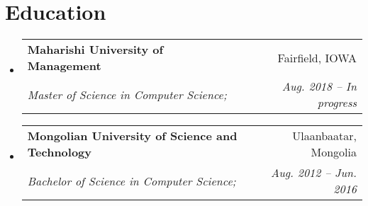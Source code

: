 \documentclass[letterpaper,11pt]{article}
\makeatletter
\newcommand{\resumeSubheading}[4]{
  \vspace{-1pt}\item
    \begin{tabular*}{0.97\textwidth}[t]{l@{\extracolsep{\fill}}r}
      \textbf{#1} & #2 \\
      \textit{\small#3} & \textit{\small #4} \\
    \end{tabular*}\vspace{-5pt}
}
\newcommand{\resumeSubHeadingListStart}{\begin{itemize}[leftmargin=*]}
\newcommand{\resumeSubHeadingListEnd}{\end{itemize}}
\makeatother
\begin{document}
\section{Education}
  \resumeSubHeadingListStart
    \resumeSubheading
      {Maharishi University of Management}{Fairfield, IOWA}
      {Master of Science in Computer Science;}{Aug. 2018 -- In progress}
    \resumeSubheading
      {Mongolian University of Science and Technology}{Ulaanbaatar, Mongolia}
      {Bachelor of Science in Computer Science;}{Aug. 2012 -- Jun. 2016}
  \resumeSubHeadingListEnd

\end{document}
